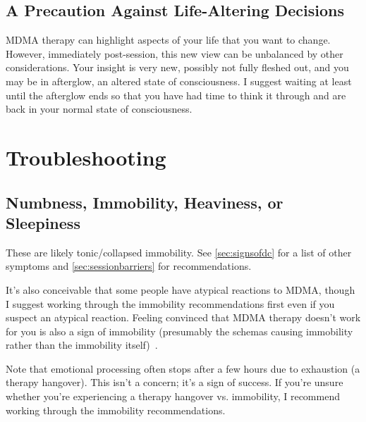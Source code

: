 \documentclass[11pt,oneside]{book}
\let\cite\parencite
\begin{document}
\subsection*{A Precaution Against Life-Altering Decisions}
MDMA therapy can highlight aspects of your life that you want to change. However, immediately post-session, this new view can be unbalanced by other considerations. Your insight is very new, possibly not fully fleshed out, and you may be in afterglow, an altered state of consciousness. I suggest waiting at least until the afterglow ends so that you have had time to think it through and are back in your normal state of consciousness.

\section{Troubleshooting}
\label{sec:troubleshooting}
\subsection{Numbness, Immobility, Heaviness, or Sleepiness}
These are likely tonic/collapsed immobility. See \cref{sec:signsofdc} for a list of other symptoms and \cref{sec:sessionbarriers} for recommendations.

It's also conceivable that some people have atypical reactions to MDMA, though I suggest working through the immobility recommendations first even if you suspect an atypical reaction. Feeling convinced that MDMA therapy doesn't work for you is also a sign of immobility (presumably the schemas causing immobility rather than the immobility itself)~\cite{razviDissociation}.

Note that emotional processing often stops after a few hours due to exhaustion (a therapy hangover). This isn't a concern; it's a sign of success. If you're unsure whether you're experiencing a therapy hangover vs. immobility, I recommend working through the immobility recommendations.
\end{document}
